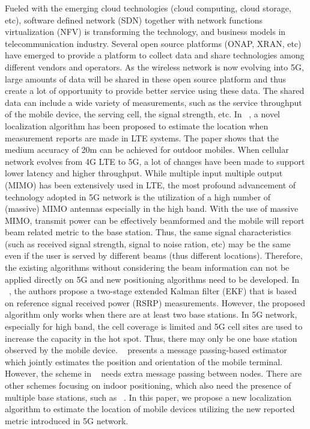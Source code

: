 \documentclass[conference, 10pt]{IEEEtran}
\begin{document}
Fueled with the emerging cloud technologies (cloud computing, cloud storage, etc), software defined network (SDN) together with 
network functions virtualization (NFV) is transforming the technology, and business models in telecommunication industry.
Several open source platforms (ONAP, XRAN, etc) have emerged to provide a platform to collect data and share technologies among different 
vendors and operators. As the wireless network is now evolving into 5G, large amounts of data will be shared in these open source platform and thus create 
a lot of opportunity to provide better service using these data. The shared data can include a wide variety of measurements, such as the service throughput of the mobile 
device, the serving cell, the signal strength, etc. In ~\cite{Pantelis2016Localization}, a novel localization algorithm has been proposed to estimate 
the location when measurement reports are made in LTE systems. The paper shows that the medium accuracy of 20m can be achieved for outdoor mobiles. 
When cellular network evolves from 4G LTE to 5G, a lot of changes have been made to support lower latency and higher throughput. While multiple input multiple output (MIMO) has been extensively used in LTE, the most profound advancement of technology adopted in 5G
network is the utilization of a high number of (massive) MIMO antennas especially in the high band. With the use of massive MIMO, transmit power can be effectively beamformed and the mobile will report beam related metric to the base station. 
Thus, the same signal characteristics (such as received signal strength, signal to noise ration, etc) may be the same even if the user is served by different beams (thus different locations). Therefore, the existing algorithms without considering the beam information can not be 
applied directly on 5G and new positioning algorithms need to be developed. In ~\cite{Costca1} ~\cite{Costa2}, the authors propose a two-stage extended Kalman filter (EKF) that is based on reference signal received power (RSRP) measurements. However, the proposed algorithm only works when there are 
at least two base stations. In 5G network, especially for high band, the cell coverage is limited and 5G cell sites are used to increase the capacity in the hot spot. Thus, there may only be one base station observed by the mobile device.
 ~\cite{Mendrzik1} presents a message passing-based estimator which jointly estimates the position and orientation of the mobile terminal. However, the scheme in ~\cite{Mendrzik1} needs extra message passing between nodes.
There are other schemes focusing on indoor positioning, which also need the presence of multiple base stations, such as ~\cite{Obeidat1}.
In this paper, we propose a new localization algorithm to estimate the location of mobile devices utilizing the new reported metric introduced in 5G network.
\end{document}
